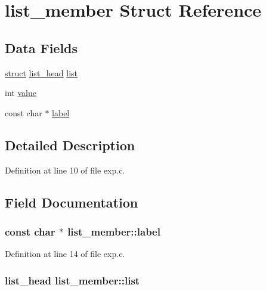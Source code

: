 \hypertarget{structlist__member}{}\section{list\+\_\+member Struct Reference}
\label{structlist__member}
\subsection*{Data Fields}
\begin{DoxyCompactItemize}
\item 
\hyperlink{notes_8txt_aeb8c646dbe282a58600b038dd7f0fed2}{struct} \hyperlink{structlist__head}{list\+\_\+head} \hyperlink{structlist__member_a3389f127e2fdd0d594c8ecfcd1c86a7f}{list}
\item 
int \hyperlink{structlist__member_af763bfcc7c384870e4fc4293f85620b3}{value}
\item 
const char $\ast$ \hyperlink{structlist__member_abc341c3b1f69ea5ab19f7270d5c7d4e9}{label}
\end{DoxyCompactItemize}


\subsection{Detailed Description}


Definition at line 10 of file exp.\+c.



\subsection{Field Documentation}
\subsubsection[{\texorpdfstring{label}{label}}]{\setlength{\rightskip}{0pt plus 5cm}const char $\ast$ list\+\_\+member\+::label}\hypertarget{structlist__member_abc341c3b1f69ea5ab19f7270d5c7d4e9}{}\label{structlist__member_abc341c3b1f69ea5ab19f7270d5c7d4e9}


Definition at line 14 of file exp.\+c.

\subsubsection[{\texorpdfstring{list}{list}}]{ {\bf list\+\_\+head} list\+\_\+member\+::list}\hypertarget{structlist__member_a3389f127e2fdd0d594c8ecfcd1c86a7f}{}\label{structlist__member_a3389f127e2fdd0d594c8ecfcd1c86a7f}


